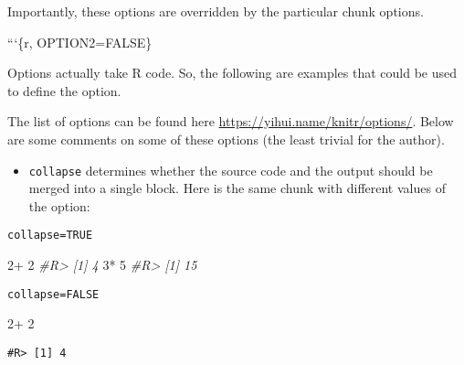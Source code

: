 \documentclass[]{book}
\newenvironment{Shaded}{}{}
\newcommand{\BaseNTok}[1]{\textcolor[rgb]{0.25,0.63,0.44}{#1}}
\newcommand{\CommentTok}[1]{\textcolor[rgb]{0.38,0.63,0.69}{\textit{#1}}}
\newcommand{\DecValTok}[1]{\textcolor[rgb]{0.25,0.63,0.44}{#1}}
\newcommand{\OperatorTok}[1]{\textcolor[rgb]{0.40,0.40,0.40}{#1}}
\newcommand{\StringTok}[1]{\textcolor[rgb]{0.25,0.44,0.63}{#1}}
\providecommand{\tightlist}{%
  \setlength{\itemsep}{0pt}\setlength{\parskip}{0pt}}
\theoremstyle{definition}
\theoremstyle{definition}
\theoremstyle{definition}
\theoremstyle{remark}
\begin{document}
Importantly, these options are overridden by the particular chunk
options.

\begin{Shaded}
\begin{Highlighting}[]
\BaseNTok{```\{r, OPTION2=FALSE\}}
\end{Highlighting}
\end{Shaded}

Options actually take R code. So, the following are examples that could
be used to define the option.

\begin{Shaded}
\end{Shaded}

The list of options can be found here
\url{https://yihui.name/knitr/options/}. Below are some comments on some
of these options (the least trivial for the author).

\begin{itemize}
\tightlist
\item
  \texttt{collapse} determines whether the source code and the output
  should be merged into a single block. Here is the same chunk with
  different values of the option:
\end{itemize}

\texttt{collapse=TRUE}

\begin{Shaded}
\begin{Highlighting}[]
\DecValTok{2}\OperatorTok{+}\StringTok{ }\DecValTok{2}
\CommentTok{#R> [1] 4}
\DecValTok{3}\OperatorTok{*}\StringTok{ }\DecValTok{5}
\CommentTok{#R> [1] 15}
\end{Highlighting}
\end{Shaded}

\texttt{collapse=FALSE}

\begin{Shaded}
\begin{Highlighting}[]
\DecValTok{2}\OperatorTok{+}\StringTok{ }\DecValTok{2}
\end{Highlighting}
\end{Shaded}

\begin{verbatim}
#R> [1] 4
\end{verbatim}
\end{document}
